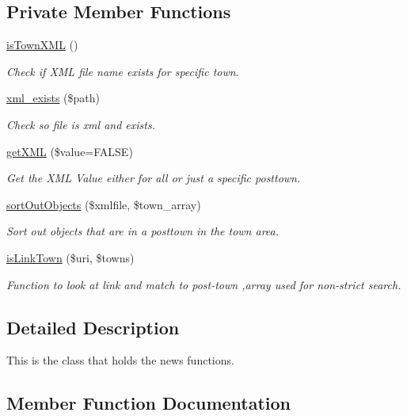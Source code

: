 \subsection*{Private Member Functions}
\begin{DoxyCompactItemize}
\item 
\hyperlink{class_news_a1b0fb404a16f7b85f85b67eb05238b69}{is\+Town\+X\+M\+L} ()
\begin{DoxyCompactList}\small\item\em Check if X\+M\+L file name exists for specific town. \end{DoxyCompactList}\item 
\hyperlink{class_news_ad6eee22d2271aa0873387099a6a4c4c8}{xml\+\_\+exists} (\$path)
\begin{DoxyCompactList}\small\item\em Check so file is xml and exists. \end{DoxyCompactList}\item 
\hyperlink{class_news_aa9f1517421b0c0ecaeb992a00c3c37a8}{get\+X\+M\+L} (\$value=F\+A\+L\+S\+E)
\begin{DoxyCompactList}\small\item\em Get the X\+M\+L Value either for all or just a specific posttown. \end{DoxyCompactList}\item 
\hyperlink{class_news_a6b9d6856e5a51474160b2869ee690902}{sort\+Out\+Objects} (\$xmlfile, \$town\+\_\+array)
\begin{DoxyCompactList}\small\item\em Sort out objects that are in a posttown in the town area. \end{DoxyCompactList}\item 
\hyperlink{class_news_a002eef91ca7d8590faf45d61b84539c0}{is\+Link\+Town} (\$uri, \$towns)
\begin{DoxyCompactList}\small\item\em Function to look at link and match to post-\/town ,array used for non-\/strict search. \end{DoxyCompactList}\end{DoxyCompactItemize}


\subsection{Detailed Description}
This is the class that holds the news functions. 

\subsection{Member Function Documentation}
\hypertarget{class_news_ae09b063136b3d937ff18a3fbf59a1110}{}
